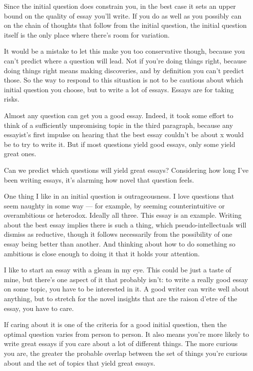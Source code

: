 \documentclass[12pt]{book}
\begin{document}
Since the initial question does constrain you, in the best case it sets
an upper bound on the quality of essay you'll write. If you do as well
as you possibly can on the chain of thoughts that follow from the
initial question, the initial question itself is the only place where
there's room for variation.

It would be a mistake to let this make you too conservative though,
because you can't predict where a question will lead. Not if you're
doing things right, because doing things right means making discoveries,
and by definition you can't predict those. So the way to respond to this
situation is not to be cautious about which initial question you choose,
but to write a lot of essays. Essays are for taking risks.

Almost any question can get you a good essay. Indeed, it took some
effort to think of a sufficiently unpromising topic in the third
paragraph, because any essayist's first impulse on hearing that the best
essay couldn't be about x would be to try to write it. But if most
questions yield good essays, only some yield great ones.

Can we predict which questions will yield great essays? Considering how
long I've been writing essays, it's alarming how novel that question
feels.

One thing I like in an initial question is outrageousness. I love
questions that seem naughty in some way --- for example, by seeming
counterintuitive or overambitious or heterodox. Ideally all three. This
essay is an example. Writing about the best essay implies there is such
a thing, which pseudo-intellectuals will dismiss as reductive, though it
follows necessarily from the possibility of one essay being better than
another. And thinking about how to do something so ambitious is close
enough to doing it that it holds your attention.

I like to start an essay with a gleam in my eye. This could be just a
taste of mine, but there's one aspect of it that probably isn't: to
write a really good essay on some topic, you have to be interested in
it. A good writer can write well about anything, but to stretch for the
novel insights that are the raison d'etre of the essay, you have to
care.

If caring about it is one of the criteria for a good initial question,
then the optimal question varies from person to person. It also means
you're more likely to write great essays if you care about a lot of
different things. The more curious you are, the greater the probable
overlap between the set of things you're curious about and the set of
topics that yield great essays.
\end{document}
